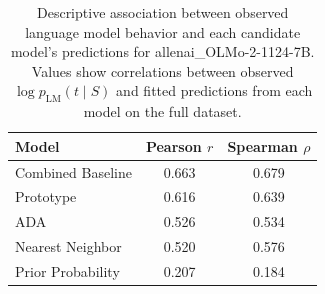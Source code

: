 \begin{table}

\caption{\label{tab:tab:model-correlations}Descriptive association between observed language model behavior and each candidate model's predictions for allenai_OLMo-2-1124-7B. Values show correlations between observed $\log p_{\mathrm{LM}}(t \mid S)$ and fitted predictions from each model on the full dataset.}
\centering
\begin{tabular}[t]{lcc}
\toprule
Model & Pearson $r$ & Spearman $\rho$\\
\midrule
Combined Baseline & 0.663 & 0.679\\
Prototype & 0.616 & 0.639\\
ADA & 0.526 & 0.534\\
Nearest Neighbor & 0.520 & 0.576\\
Prior Probability & 0.207 & 0.184\\
\bottomrule
\end{tabular}
\end{table}
